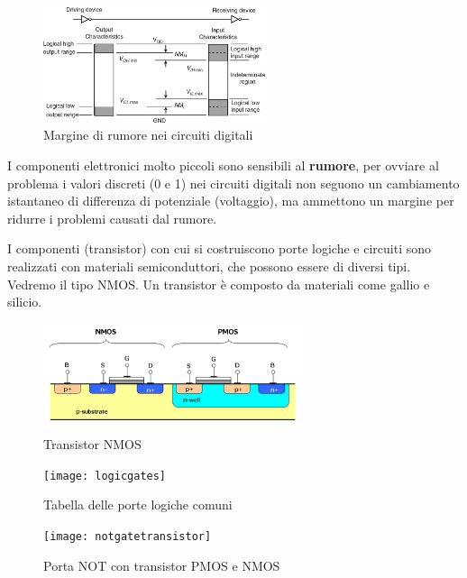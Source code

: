 \begin{figure}
	\begin{center}
		\includegraphics[width=0.58\textwidth]{noisemargin}
	\end{center}
	\caption{Margine di rumore nei circuiti digitali}	
\end{figure}


I componenti elettronici molto piccoli sono sensibili al \textbf{rumore}, per ovviare al problema i valori discreti (0 e 1) nei circuiti digitali non seguono un cambiamento istantaneo di differenza di potenziale (voltaggio), ma ammettono un margine per ridurre i problemi causati dal rumore.


I componenti (transistor) con cui si costruiscono porte logiche e circuiti sono realizzati con materiali semiconduttori, che possono essere di diversi tipi. Vedremo il tipo NMOS. Un transistor è composto da materiali come gallio e silicio.

\begin{figure}
	\begin{center}
		\includegraphics[width=0.68\textwidth]{cmos}
	\end{center}
	\caption{Transistor NMOS}
\end{figure}


\begin{figure}
	\centering
	\caption{Tabella delle porte logiche comuni}
	\texttt{[image: logicgates]}
\end{figure}

\begin{figure}
	\centering
	\caption{Porta NOT con transistor PMOS e NMOS}
	\texttt{[image: notgatetransistor]}
\end{figure}

